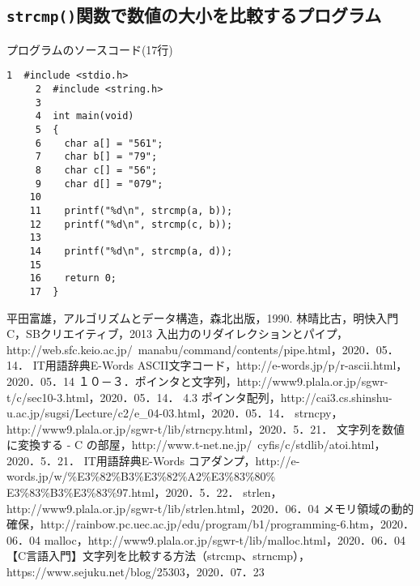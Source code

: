 \subsection{\texttt{strcmp()}関数で数値の大小を比較するプログラム}\label{funccmp}
プログラムのソースコード(17行)
\begin{Verbatim}[fontsize=\small, baselinestretch=0.8]
     1	#include <stdio.h>
     2	#include <string.h>
     3	
     4	int main(void)
     5	{
     6	  char a[] = "561";
     7	  char b[] = "79";
     8	  char c[] = "56";
     9	  char d[] = "079";
    10	
    11	  printf("%d\n", strcmp(a, b));
    12	  printf("%d\n", strcmp(c, b));
    13	
    14	  printf("%d\n", strcmp(a, d));
    15	
    16	  return 0;
    17	}
\end{Verbatim}

\begin{thebibliography}{99}
   平田富雄，アルゴリズムとデータ構造，森北出版，1990.
   林晴比古，明快入門C，SBクリエイティブ，2013
   入出力のリダイレクションとパイプ，http://web.sfc.keio.ac.jp/~manabu/command/contents/pipe.html，2020．05．14．
   IT用語辞典E-Words ASCII文字コード，http://e-words.jp/p/r-ascii.html，2020．05．14
   １０－３．ポインタと文字列，http://www9.plala.or.jp/sgwr-t/c/sec10-3.html，2020．05．14．
   4.3 ポインタ配列，http://cai3.cs.shinshu-u.ac.jp/sugsi/Lecture/c2/e\_04-03.html，2020．05．14．%
   strncpy，http://www9.plala.or.jp/sgwr-t/lib/strncpy.html，2020．5．21．
   文字列を数値に変換する - C の部屋，http://www.t-net.ne.jp/~cyfis/c/stdlib/atoi.html，2020．5．21．
   IT用語辞典E-Words コアダンプ，http://e-words.jp/w/\%E3\%82\%B3\%E3\%82\%A2\%E3\%83\%80\%
E3\%83\%B3\%E3\%83\%97.html，2020．5．22．%
   strlen，http://www9.plala.or.jp/sgwr-t/lib/strlen.html，2020．06．04
   メモリ領域の動的確保，http://rainbow.pc.uec.ac.jp/edu/program/b1/programming-6.htm，2020．06．04
   malloc，http://www9.plala.or.jp/sgwr-t/lib/malloc.html，2020．06．04
   【C言語入門】文字列を比較する方法（strcmp、strncmp），https://www.sejuku.net/blog/25303，2020．07．23
\end{thebibliography}


